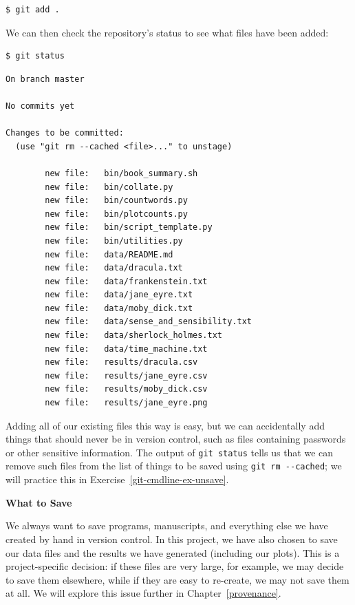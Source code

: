 \documentclass[
]{krantz}
\renewenvironment{quote}{\begin{VF}}{\end{VF}}
\begin{document}
\begin{verbatim}
$ git add .
\end{verbatim}

We can then check the repository's status to see what files have been added:

\begin{verbatim}
$ git status
\end{verbatim}

\begin{verbatim}
On branch master

No commits yet

Changes to be committed:
  (use "git rm --cached <file>..." to unstage)

        new file:   bin/book_summary.sh
        new file:   bin/collate.py
        new file:   bin/countwords.py
        new file:   bin/plotcounts.py
        new file:   bin/script_template.py
        new file:   bin/utilities.py
        new file:   data/README.md
        new file:   data/dracula.txt
        new file:   data/frankenstein.txt
        new file:   data/jane_eyre.txt
        new file:   data/moby_dick.txt
        new file:   data/sense_and_sensibility.txt
        new file:   data/sherlock_holmes.txt
        new file:   data/time_machine.txt
        new file:   results/dracula.csv
        new file:   results/jane_eyre.csv
        new file:   results/moby_dick.csv
        new file:   results/jane_eyre.png
\end{verbatim}

Adding all of our existing files this way is easy,
but we can accidentally add things that should never be in version control,
such as files containing passwords or other sensitive information.
The output of \texttt{git\ status} tells us that
we can remove such files from the list of things to be saved
using \texttt{git\ rm\ -\/-cached};
we will practice this in Exercise~\ref{git-cmdline-ex-unsave}.

\begin{quote}
\textbf{What to Save}

We always want to save programs, manuscripts,
and everything else we have created by hand
in version control.
In this project,
we have also chosen to save our data files
and the results we have generated
(including our plots).
This is a project-specific decision:
if these files are very large,
for example,
we may decide to save them elsewhere,
while if they are easy to re-create,
we may not save them at all.
We will explore this issue further in Chapter~\ref{provenance}.
\end{quote}
\end{document}

